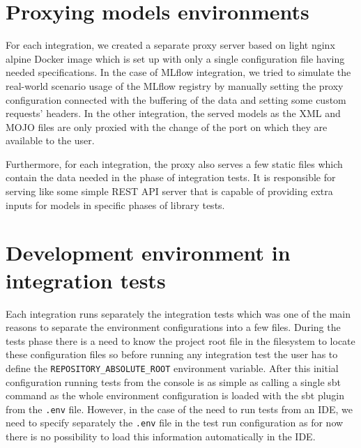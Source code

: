 \section{Proxying models environments}

For each integration, we created a separate proxy server based on light nginx alpine Docker image which
is set up with only a single configuration file having needed specifications. In the case of MLflow
integration, we tried to simulate the real-world scenario usage of the MLflow registry by manually setting
the proxy configuration connected with the buffering of the data and setting some custom requests’ headers.
In the other integration, the served models as the XML and MOJO files are only proxied with the change of
the port on which they are available to the user.

Furthermore, for each integration, the proxy also serves a few static files which contain the data needed
in the phase of integration tests. It is responsible for serving like some simple REST API server that
is capable of providing extra inputs for models in specific phases of library tests.

\section{Development environment in integration tests}

Each integration runs separately the integration tests which was one of the main reasons to separate
the environment configurations into a few files. During the tests phase there is a need to know the project
root file in the filesystem to locate these configuration files so before running any integration test
the user has to define the \texttt{REPOSITORY\_ABSOLUTE\_ROOT} environment variable. After this initial
configuration running tests from the console is as simple as calling a single sbt command as the whole
environment configuration is loaded with the sbt plugin from the \texttt{.env} file. However, in the case of the need
to run tests from an IDE, we need to specify separately the \texttt{.env} file in the test run configuration as for now
there is no possibility to load this information automatically in the IDE.

